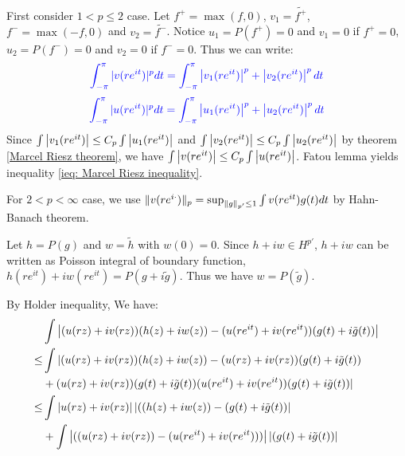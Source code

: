 \begin{remark}
    First consider $1<p\leq 2$ case. Let $f^+=\max{(f,0)}$, $v_1=\tilde{f^+}$, $f^-=\max{(-f,0)}$ and $v_2=\tilde{f^-}$. Notice $u_1=P(f^+)=0$ and $v_1=0$ if $f^+=0$,
    $u_2=P(f^-)=0$ and $v_2=0$ if $f^-=0$. Thus we can write:
    \begin{equation*}
        {\color{blue}\int_{-\pi}^{\pi}{\lvert v(re^{it})\rvert^p d t}=\int_{-\pi}^{\pi}{\left\lvert v_1(re^{it})\right\rvert^p+\left\lvert v_2(re^{it})\right\rvert^p d t}}
    \end{equation*}
    \begin{equation*}
        {\color{blue}\int_{-\pi}^{\pi}{\lvert u(re^{it})\rvert^p d t}=\int_{-\pi}^{\pi}{\left\lvert u_1(re^{it})\right\rvert^p+\left\lvert u_2(re^{it})\right\rvert^p d t}}
    \end{equation*}
    Since $\int{\left\lvert v_1(re^{it})\right\rvert}\leq C_p\int{\left\lvert u_1(re^{it})\right\rvert}$ and $\int{\left\lvert v_2(re^{it})\right\rvert}\leq C_p\int{\left\lvert u_2(re^{it})\right\rvert}$ by theorem
    \ref{Marcel Riesz theorem}, we have $\int{\left\lvert v(re^{it})\right\rvert}\leq C_p\int{\left\lvert u(re^{it})\right\rvert}$. Fatou lemma yields inequality \eqref{ieq: Marcel Riesz inequality}.\par
    For $2<p<\infty$ case, we use $\lVert v(re^{i\cdot})\rVert_p=\sup_{\lVert g\rVert_{p'}\leq 1}{\int{v(re^{it})g(t)d t}}$ by Hahn-Banach theorem.\par
    Let $h=P(g)$ and $w=\tilde{h}$ with $w(0)=0$. Since $h+iw\in H^{p'}$, $h+iw$ can be written as Poisson integral of boundary function, $h(re^{it})+iw(re^{it})=P(g+i\tilde{g})$. Thus we have $w=P(\tilde{g})$.\par
    {\color{blue}By Holder inequality, We have:
        \begin{align*}
                 & \int{\abs{(u(rz)+iv(rz))(h(z)+iw(z))-(u(re^{it})+iv(re^{it})) (g(t)+i\tilde{g}(t))}}                                     \\
            \leq & \int\vert (u(r z)+iv(r z))(h(z)+i w(z))-(u(r z)+iv(r z))(g(t)+i\tilde{g}(t))                                             \\
                 & +(u(r z)+iv(r z))(g(t)+i\tilde{g}(t))(u(re^{it})+iv(re^{it}))(g(t)+i\tilde{g}(t)) \vert                                  \\
            \leq & \int\abs{u(rz)+iv(rz)}\abs{((h(z)+iw(z))-(g(t)+i\tilde{g}(t))}                                                           \\
                 & +\int\abs{((u(rz)+iv(rz))-(u(re^{it})+iv(re^{it})))}\abs{(g(t)+i\tilde{g}(t))}                                           \\

\end{align*}}
\end{remark}
